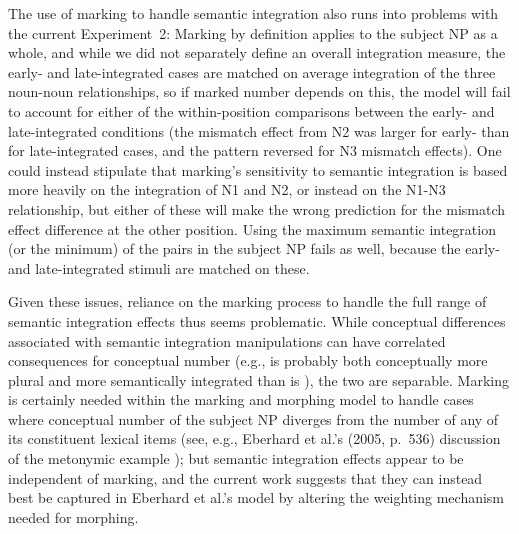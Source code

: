 \documentclass[12pt,titlepage]{article}
\newcommand{\IGNORE}[1]{} %
\begin{document}
The use of marking to handle semantic integration also runs into problems
with the current Experiment~2: Marking by definition applies to the subject
NP as a whole, and while we did not separately define an overall
integration measure, the early- and late-integrated cases are matched on
average integration of the three noun-noun relationships, so if marked
number depends on this, the model will fail to account for either of the
within-position comparisons between the early- and late-integrated
conditions (the mismatch effect from N2 was larger for early- than for
late-integrated cases, and the pattern reversed for N3 mismatch effects).
One could instead stipulate that marking's sensitivity to semantic
integration is based more heavily on the integration of N1 and N2, or
instead on the N1-N3 relationship, but either of these will make the wrong
prediction for the mismatch effect difference at the other position.  Using
the maximum semantic integration (or the minimum) of the pairs in the
subject NP fails as well, because the early- and late-integrated stimuli
are matched on these.

Given these issues, reliance on the marking process to handle the full
range of semantic integration effects thus seems problematic.  While
conceptual differences associated with semantic integration manipulations
can have correlated consequences for conceptual number (e.g.,  is probably both conceptually more plural and more
semantically integrated than is ), the two
are separable.  Marking is certainly needed within the marking and morphing
model to handle cases where conceptual number of the subject NP diverges
from the number of any of its constituent lexical items (see, e.g.,
Eberhard et al.'s (2005, p.~536) discussion of the metonymic example
); but semantic
integration effects appear to be independent of marking, and the current
work suggests that they can instead best be captured in Eberhard et al.'s
model by altering the weighting mechanism needed for morphing.

\IGNORE{---anything to say about Vig\&Hartsuiker? (iffy) Prob not\ldots}

\IGNORE{\subsection{Semantic Integration and Timing of Planning}}

\IGNORE{---more on semint}
\end{document}
